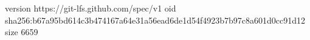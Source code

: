version https://git-lfs.github.com/spec/v1
oid sha256:b67a95bd614c3b474167a64e31a56ead6de1d54f4923b7b97c8a601d0cc91d12
size 6659
